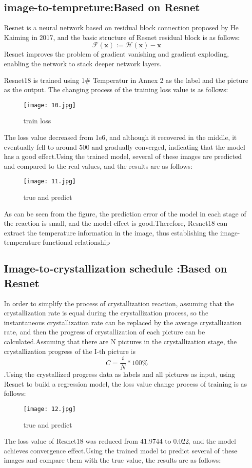 \documentclass[12pt]{apmcmthesis}
\begin{document}
\subsection{image-to-tempreture:Based on Resnet}
Resnet\cite{10} is a neural network based on residual block connection proposed by He Kaiming in 2017, and the basic structure of Resnet residual block is as follows:
$$\mathcal{F}(\mathbf{x}):=\mathcal{H}(\mathbf{x})-\mathbf{x}$$Resnet improves the problem of gradient vanishing and gradient exploding, enabling the network to stack deeper network layers.

Resnet18 is trained using 1\# Temperatur in Annex 2 as the label and the picture as the output. The changing process of the training loss value is as follows:
\begin{figure}[htbp]
	\centering
	\texttt{[image: 10.jpg]}
	\caption{train loss}
	\label{a}
\end{figure}

The loss value decreased from 1e6, and although it recovered in the middle, it eventually fell to around 500 and gradually converged, indicating that the model has a good effect.Using the trained model, several of these images are predicted and compared to the real values, and the results are as follows:
\begin{figure}[htbp]
	\centering
	\texttt{[image: 11.jpg]}
	\caption{true and predict}
	\label{a}
\end{figure}
As can be seen from the figure, the prediction error of the model in each stage of the reaction is small, and the model effect is good.Therefore, Resnet18 can extract the temperature information in the image, thus establishing the image-temperature functional relationship

\subsection{Image-to-crystallization schedule :Based on Resnet}
In order to simplify the process of crystallization reaction, assuming that the crystallization rate is equal during the crystallization process, so the instantaneous crystallization rate can be replaced by the average crystallization rate, and then the progress of crystallization of each picture can be calculated.Assuming that there are N pictures in the crystallization stage, the crystallization progress of the I-th picture is$$C=\frac{i}{N} * 100\%$$.Using the crystallized progress data as labels and all pictures as input, using Resnet to build a regression model, the loss value change process of training is as follows:
\begin{figure}[htbp]
	\centering
	\texttt{[image: 12.jpg]}
	\caption{true and predict}
	\label{a}
\end{figure}
The loss value of Resnet18 was reduced from 41.9744 to 0.022, and the model achieves convergence effect.Using the trained model to predict several of these images and compare them with the true value, the results are as follows:
\end{document}
